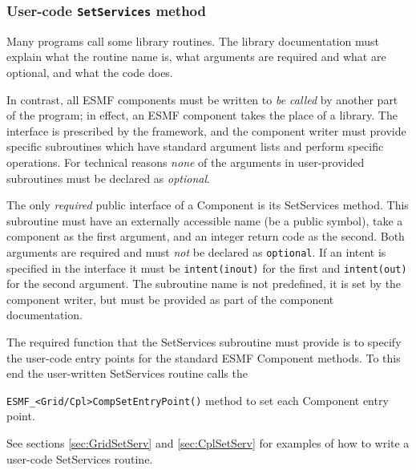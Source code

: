 %

\subsubsection{User-code {\tt SetServices} method}

Many programs call some library routines.  The library
documentation must explain what the routine name is, what arguments 
are required and what are optional, and what the code does.  

In contrast, all ESMF components must be written to {\it be called}
by another part of the program; in effect, an ESMF component takes the 
place of a library.  The interface is prescribed by the framework,
and the component writer must provide specific subroutines which 
have standard argument lists and perform specific operations.
For technical reasons {\em none} of the arguments in user-provided subroutines
must be declared as {\em optional}.

The only {\em required} public interface of a Component is its
SetServices method.  This subroutine must have an
externally accessible name (be a public symbol), take a component
as the first argument, and an integer return code as the second. 
Both arguments are required and must {\em not} be declared as 
{\tt optional}. If an intent is specified in the interface it must be 
{\tt intent(inout)} for the first and {\tt intent(out)} for the 
second argument. The subroutine name is not predefined, it is set by the
component writer, but must be provided as part of the component 
documentation.

The required function that the SetServices subroutine must provide is to
specify the user-code entry points for the standard ESMF Component methods. To
this end the user-written SetServices routine calls the 

{\tt ESMF\_<Grid/Cpl>CompSetEntryPoint()} method to set each 
Component entry point.

See sections \ref{sec:GridSetServ} and \ref{sec:CplSetServ} for examples of
how to write a user-code SetServices routine.

